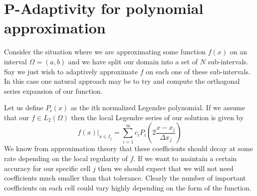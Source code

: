 \documentclass[10]{amsart}
\begin{document}
% 
% 
\section{P-Adaptivity for polynomial approximation}
Consider the situation where we are approximating
some function $f(x)$ on an interval $\Omega=(a,b)$ and we have split our domain into a set of $N$ sub-intervals.
Say we just wish
to adaptively approximate $f$ on each one of these sub-intervals. In this case one natural approach may be to try and
compute the orthogonal series expansion of our function. 

Let us define $P_i(x)$ as the ith normalized Legendre polynomial. If we assume that our $f \in L_2 (\Omega)$
then the local Legendre series of our solution is given by 
$$f(x)|_{x \in I_j}=\sum_{i=1}^\infty c_i P_i\left(2\frac{x-x_j}{\Delta x_j}\right)$$
We know from approximation theory that these coefficients should decay at some rate
depending on the local regularity of $f$. If we want to maintain a certain
accuracy for our specific cell $j$ then we should expect that we will not need coefficients much smaller than that
tolerance.
Clearly the number of important coefficients on each cell
could vary highly depending on the form of the function.
\end{document}
